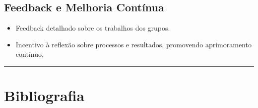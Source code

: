 \documentclass[
  letterpaper,
  DIV=11,
  numbers=noendperiod]{scrreprt}
\providecommand{\tightlist}{%
  \setlength{\itemsep}{0pt}\setlength{\parskip}{0pt}}
\begin{document}
\subsection{Feedback e Melhoria
Contínua}\label{feedback-e-melhoria-contuxednua}

\begin{itemize}
\tightlist
\item
  Feedback detalhado sobre os trabalhos dos grupos.\\
\item
  Incentivo à reflexão sobre processos e resultados, promovendo
  aprimoramento contínuo.
\end{itemize}

\begin{center}\rule{0.5\linewidth}{0.5pt}\end{center}

\section{Bibliografia}\label{bibliografia}
\end{document}
